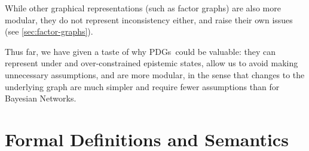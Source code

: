 \documentclass{article}
\newcommand\changeoff{\color{black} }
\newcommand{\MN}{PDG}
\newcommand{\MNs}{\MN s}
\begin{document}
	\begin{example}
	\end{example}

	
	While other graphical representations (such as factor graphs) are also more modular, they do not represent inconsistency either, and raise their own issues (see \cref{sec:factor-graphs}). 
	
	Thus far, we have given a taste of why \MNs\ could be valuable: they can represent under and over-constrained epistemic states, allow us to avoid making unnecessary assumptions, and are more modular, in the sense that changes to the underlying graph are much simpler and require fewer assumptions than for Bayesian Networks.	
	\changeoff
	
	



	
	
	\section{Formal Definitions and Semantics}\label{sec:formal+semantics}
	
\end{document}
